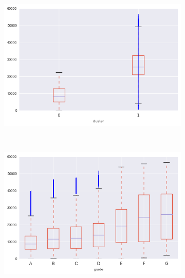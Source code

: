 \begin{anexosenv}
\begin{figure}[t!]
\begin{subfigure}[t]{0.5\textwidth}
            \centerline{\includegraphics[width=1\textwidth]{img/total_pymnt_by_cluster}}
        \end{subfigure}%
        ~ 
        \begin{subfigure}[t]{0.5\textwidth}
            \centering
   
            \centerline{\includegraphics[width=1\textwidth]{img/total_pymnt_by_grade}}

        \end{subfigure}
        \\
                \caption{out\textunderscore prncp\textunderscore inv}
        \begin{subfigure}[t]{0.5\textwidth}
            \centering


\end{subfigure}
\end{figure}
\end{anexosenv}
